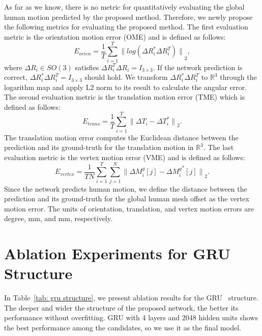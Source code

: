 \documentclass[10pt,twocolumn,letterpaper]{article}
\begin{document}
As far as we know, there is no metric for quantitatively evaluating the global human motion predicted by the proposed method. Therefore, we newly propose the following metrics for evaluating the proposed method. The first evaluation metric is the orientation motion error (OME) and is defined as follows:
\begin{equation}
\label{eq: orientation motion error}
    E_{orien}=\frac{1}{T}{\sum^{T}_{i=1}}{\|log({\Delta{R}_{i}^{*}}{\Delta{R}_{i}^{T}})\|}_{2},
\end{equation}
where $\Delta{R}_{i}\in{SO(3)}$ satisfies $\Delta{R}_{i}^{T}\Delta{R}_{i}=I_{3\times3}$. If the network prediction is correct, $\Delta{R}_{i}^{*}\Delta{R}_{i}^{T}=I_{3\times3}$ should hold. We transform $\Delta{R}_{i}^{*}\Delta{R}_{i}^{T}$ to $\mathbb{R}^{3}$ through the logarithm map and apply L2 norm to its result to calculate the angular error. The second evaluation metric is the translation motion error (TME) which is defined as follows:
\begin{equation}
\label{eq: translation motion error}
    E_{trans}=\frac{1}{T}{\sum^{T}_{i=1}}{\|{\Delta{T}_{i}}-{\Delta{T}_{i}^{*}}\|}_{2}.
\end{equation}
The translation motion error computes the Euclidean distance between the prediction and its ground-truth for the translation motion in $\mathbb{R}^3$. The last evaluation metric is the vertex motion error (VME) and is defined as follows:
\begin{equation}
\label{eq: vertex motion error}
    E_{vertex}=\frac{1}{TN}{\sum^{T}_{i=1}}{\sum^{N}_{j=1}}{\|{\Delta{M}^{g}_{i}[j]}-{\Delta{{M}^{g}_{i}}^{*}[j]}\|}_{2}.
\end{equation}
Since the network predicts human motion, we define the distance between the prediction and its ground-truth for the global human mesh offset as the vertex motion error. The units of orientation, translation, and vertex motion errors are degree, mm, and mm, respectively.





\section{Ablation Experiments for GRU Structure}
\label{sec:ablation_experiments}

In Table~\ref{tab: gru structure}, we present ablation results for the GRU~\cite{cho-etal-2014-learning} structure. The deeper and wider the structure of the proposed network, the better its performance without overfitting. GRU with 4 layers and 2048 hidden units shows the best performance among the candidates, so we use it as the final model.
\end{document}

